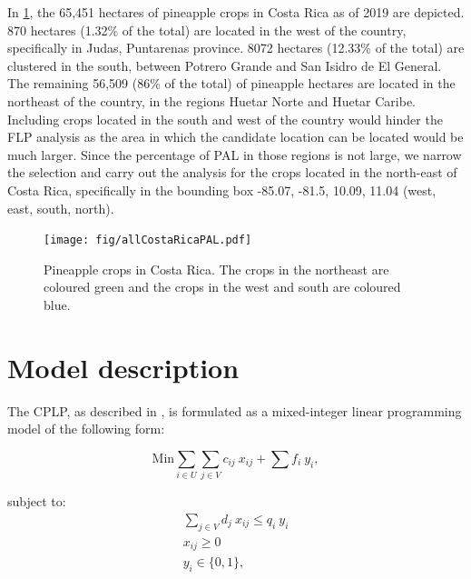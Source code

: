 In \cref{allCRPAL}, the 65,451 hectares of pineapple crops in Costa Rica as of 2019 are depicted. 870 hectares (1.32\% of the total) are located in the west of the country, specifically in Judas, Puntarenas province. 8072 hectares (12.33\% of the total) are clustered in the south, between Potrero Grande and San Isidro de El General. The remaining 56,509 (86\% of the total) of pineapple hectares are located in the northeast of the country, in the regions Huetar Norte and Huetar Caribe. Including crops located in the south and west of the country would hinder the FLP analysis as the area in which the candidate location can be located would be much larger. Since the percentage of PAL in those regions is not large, we narrow the selection and carry out the analysis for the crops located in the north-east of Costa Rica, specifically in the bounding box -85.07, -81.5, 10.09, 11.04 (west, east, south, north). 


\begin{figure}[H]
\caption[Pineapple crops in Costa Rica]{Pineapple crops in Costa Rica. The crops in the northeast are coloured green and the crops in the west and south are coloured blue.}  
\label{allCRPAL}
\centering
\texttt{[image: fig/allCostaRicaPAL.pdf]}
\end{figure}


\section{Model description}

The CPLP, as described in \cite{farahani2009facility}, is formulated as a mixed-integer linear programming model of the following form:

\begin{equation}
\label{objectivefun}
    \text{Min} \sum_{i \in U} \sum_{j \in V} c_{ij} \ x_{ij} + \sum f_i \ y_i,
\end{equation} 

subject to:
\begin{gather}
    \label{capacity}
    \sum_{j \in V} d_{j} \ x_{ij} \leq q_{i} \ y_{i} \\ 
    \label{onetone}
    x_{ij}\geq 0 \\
    y_i \in \{0,1\},
\end{gather}

